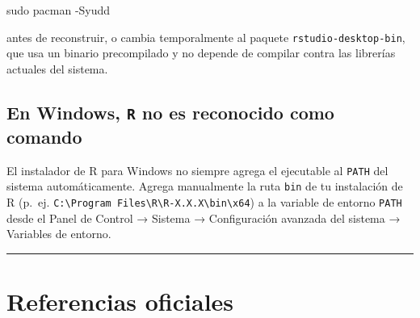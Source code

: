 \documentclass[
  man,
  floatsintext,
  longtable,
  a4paper,
  nolmodern,
  notxfonts,
  notimes,
  12pt,
  colorlinks=true,linkcolor=blue,citecolor=blue,urlcolor=blue]{apa7}
\newenvironment{Shaded}{\begin{snugshade}}{\end{snugshade}}
\newcommand{\AttributeTok}[1]{\textcolor[rgb]{0.40,0.45,0.13}{#1}}
\newcommand{\FunctionTok}[1]{\textcolor[rgb]{0.28,0.35,0.67}{#1}}
\newcommand{\NormalTok}[1]{\textcolor[rgb]{0.00,0.23,0.31}{#1}}
\begin{document}
\begin{Shaded}
\begin{Highlighting}[]
\FunctionTok{sudo}\NormalTok{ pacman }\AttributeTok{{-}Syudd}
\end{Highlighting}
\end{Shaded}

antes de reconstruir, o cambia temporalmente al paquete
\texttt{rstudio-desktop-bin}, que usa un binario precompilado y no
depende de compilar contra las librerías actuales del sistema.

\subsection{\texorpdfstring{En Windows, \texttt{R} no es reconocido como
comando}{En Windows, R no es reconocido como comando}}\label{en-windows-r-no-es-reconocido-como-comando}

El instalador de R para Windows no siempre agrega el ejecutable al
\texttt{PATH} del sistema automáticamente. Agrega manualmente la ruta
\texttt{bin} de tu instalación de R (p.~ej.
\texttt{C:\textbackslash{}Program\ Files\textbackslash{}R\textbackslash{}R-X.X.X\textbackslash{}bin\textbackslash{}x64})
a la variable de entorno \texttt{PATH} desde el Panel de Control →
Sistema → Configuración avanzada del sistema → Variables de entorno.

\begin{center}\rule{0.5\linewidth}{0.5pt}\end{center}

\section{Referencias oficiales}\label{referencias-oficiales}
\end{document}
